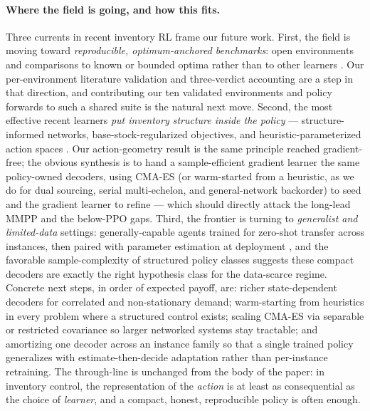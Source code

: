 \documentclass[11pt]{article}
\begin{document}
\paragraph{Where the field is going, and how this fits.}
Three currents in recent inventory RL frame our future work. First, the field is moving toward
\emph{reproducible, optimum-anchored benchmarks}: open environments and comparisons to known or bounded
optima rather than to other learners \citep{alvo2023networks,temizoz2025dcl}. Our per-environment
literature validation and three-verdict accounting are a step in that direction, and contributing our
ten validated environments and policy forwards to such a shared suite is the natural next move.
Second, the most effective recent learners \emph{put inventory structure inside the policy} ---
structure-informed networks, base-stock-regularized objectives, and heuristic-parameterized action
spaces \citep{maggiar2025structure,temizoz2025dcl}. Our action-geometry result is the same principle
reached gradient-free; the obvious synthesis is to hand a sample-efficient gradient learner the same
policy-owned decoders, using CMA-ES (or warm-started from a heuristic, as we do for dual sourcing,
serial multi-echelon, and general-network backorder) to seed and the gradient learner to refine ---
which should directly attack the long-lead MMPP and the below-PPO gaps. Third, the frontier is turning
to \emph{generalist and limited-data} settings: generally-capable agents trained for zero-shot transfer
across instances, then paired with parameter estimation at deployment
\citep{temizoz2024zsg,vanvuchelen2020jrp}, and the favorable sample-complexity of structured policy
classes \citep{xie2024vc} suggests these compact decoders are exactly the right hypothesis class for
the data-scarce regime. Concrete next steps, in order of expected payoff, are: richer state-dependent
decoders for correlated and non-stationary demand; warm-starting from heuristics in every problem where
a structured control exists; scaling CMA-ES via separable or restricted covariance so larger networked
systems stay tractable; and amortizing one decoder across an instance family so that a single trained
policy generalizes with estimate-then-decide adaptation rather than per-instance retraining. The
through-line is unchanged from the body of the paper: in inventory control, the representation of the
\emph{action} is at least as consequential as the choice of \emph{learner}, and a compact, honest,
reproducible policy is often enough.
\end{document}
